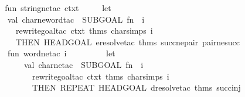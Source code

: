 \begin{isabellebody}
\isadelimproof
\ %
\endisadelimproof
%
\isatagproof
\isacommand{{\isachardot}{\kern0pt}{\isachardot}{\kern0pt}}\isamarkupfalse%
%
\endisatagproof
{\isafoldproof}%
%
\isadelimproof
%
\endisadelimproof
\isanewline
%
\isadelimML
\isanewline
%
\endisadelimML
%
\isatagML
{}\isamarkupfalse%
\ {\isacartoucheopen}\isanewline
\ \ fun\ string{\isacharunderscore}{\kern0pt}ne{\isacharunderscore}{\kern0pt}tac\ ctxt\ {\isacharequal}{\kern0pt}\isanewline
\ \ \ \ let\isanewline
\ \ \ \ \ \ val\ char{\isacharunderscore}{\kern0pt}ne{\isacharunderscore}{\kern0pt}word{\isacharunderscore}{\kern0pt}tac\ {\isacharequal}{\kern0pt}\ SUBGOAL\ {\isacharparenleft}{\kern0pt}fn\ {\isacharparenleft}{\kern0pt}{\isacharunderscore}{\kern0pt}{\isacharcomma}{\kern0pt}\ i{\isacharparenright}{\kern0pt}\ {\isacharequal}{\kern0pt}{\isachargreater}{\kern0pt}\isanewline
\ \ \ \ \ \ \ \ rewrite{\isacharunderscore}{\kern0pt}goal{\isacharunderscore}{\kern0pt}tac\ ctxt\ {\isacharat}{\kern0pt}{\isacharbraceleft}{\kern0pt}thms\ char{\isacharunderscore}{\kern0pt}simps{\isacharbraceright}{\kern0pt}\ i\isanewline
\ \ \ \ \ \ \ \ THEN\ HEADGOAL\ {\isacharparenleft}{\kern0pt}eresolve{}{\isacharunderscore}{\kern0pt}tac\ {\isacharat}{\kern0pt}{\isacharbraceleft}{\kern0pt}thms\ succ{\isacharunderscore}{\kern0pt}ne{\isacharunderscore}{\kern0pt}pair\ pair{\isacharunderscore}{\kern0pt}ne{\isacharunderscore}{\kern0pt}succ{\isacharbraceright}{\kern0pt}{\isacharparenright}{\kern0pt}{\isacharparenright}{\kern0pt}\isanewline
\isanewline
\ \ \ \ \ \ fun\ word{\isacharunderscore}{\kern0pt}ne{\isacharunderscore}{\kern0pt}tac\ i\ {\isacharequal}{\kern0pt}\isanewline
\ \ \ \ \ \ \ \ let\isanewline
\ \ \ \ \ \ \ \ \ \ val\ char{\isacharunderscore}{\kern0pt}ne{\isacharunderscore}{\kern0pt}tac\ {\isacharequal}{\kern0pt}\ SUBGOAL\ {\isacharparenleft}{\kern0pt}fn\ {\isacharparenleft}{\kern0pt}{\isacharunderscore}{\kern0pt}{\isacharcomma}{\kern0pt}\ i{\isacharparenright}{\kern0pt}\ {\isacharequal}{\kern0pt}{\isachargreater}{\kern0pt}\isanewline
\ \ \ \ \ \ \ \ \ \ \ \ rewrite{\isacharunderscore}{\kern0pt}goal{\isacharunderscore}{\kern0pt}tac\ ctxt\ {\isacharat}{\kern0pt}{\isacharbraceleft}{\kern0pt}thms\ char{\isacharunderscore}{\kern0pt}simps{\isacharbraceright}{\kern0pt}\ i\isanewline
\ \ \ \ \ \ \ \ \ \ \ \ THEN\ REPEAT\ {\isacharparenleft}{\kern0pt}HEADGOAL\ {\isacharparenleft}{\kern0pt}dresolve{}{\isacharunderscore}{\kern0pt}tac\ {\isacharat}{\kern0pt}{\isacharbraceleft}{\kern0pt}thms\ succ{\isacharunderscore}{\kern0pt}inj{\isacharbraceright}{\kern0pt}{\isacharparenright}{\kern0pt}{\isacharparenright}{\kern0pt}\isanewline

\end{isabellebody}
